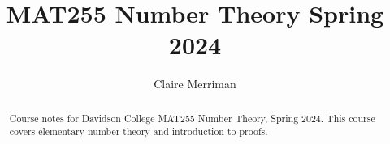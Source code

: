 \documentclass{xourse}
\title{MAT255 Number Theory Spring 2024}
\author{Claire Merriman}
\begin{document}
  
\begin{abstract} %
Course notes for Davidson College MAT255 Number Theory, Spring 2024. This course covers elementary number theory and introduction to proofs.
\end{abstract}  
\maketitle  
 
\chapterstyle
\sectionstyle  

\chapterstyle










\end{document}
